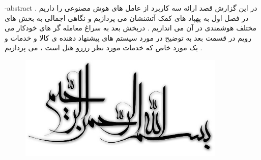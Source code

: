 \graphicspath{ {./img} }
\fa-abstract{
در این گزارش قصد ارائه سه کاربرد از عامل های هوش مصنوعی را داریم . در فصل اول به  پهپاد های کمک آتشنشان می پردازیم و نگاهی اجمالی به بخش های مختلف هوشمندی در آن می اندازیم . دربخش بعد به سراغ معامله گر های خودکار می رویم در قسمت بعد به توضیح در مورد سیستم های پیشنهاد دهنده ی کالا و خدمات و یک مورد خاص که خدمات مورد نظر رزرو هتل است ، می پردازیم .
}


\renewcommand{\bibname}{مراجع}



\AUTtitle
\vspace*{7cm}
\thispagestyle{empty}
\begin{center}
\includegraphics[height=5cm,width=12cm]{besm}
\end{center}
